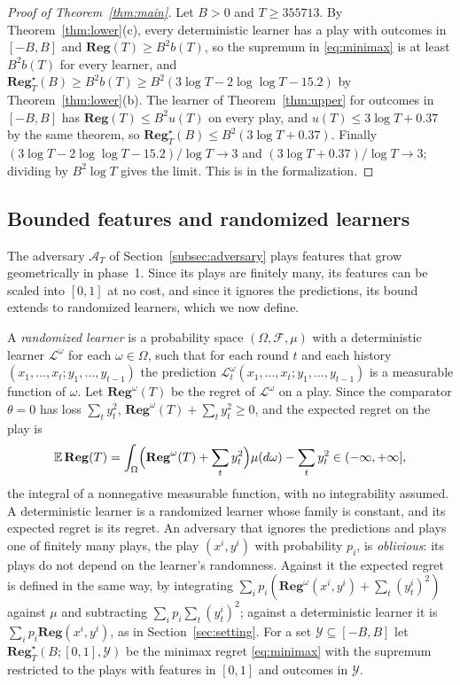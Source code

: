 \documentclass[12pt]{amsart}
\theoremstyle{definition}
\numberwithin{equation}{section}
\newcommand{\E}{\mathbb{E}}
\newcommand{\Reg}{\mathbf{Reg}}
\newcommand{\Regs}{\mathbf{Reg}^{\star}}
\begin{document}
\begin{proof}[Proof of Theorem~\ref{thm:main}]
Let $B>0$ and $T\ge355713$. By Theorem~\ref{thm:lower}(c), every deterministic learner has a play with outcomes in $[-B,B]$ and $\Reg(T)\ge B^2b(T)$, so the supremum in \eqref{eq:minimax} is at least $B^2b(T)$ for every learner, and $\Regs_T(B)\ge B^2b(T)\ge B^2(3\log T-2\log\log T-15.2)$ by Theorem~\ref{thm:lower}(b). The learner of Theorem~\ref{thm:upper} for outcomes in $[-B,B]$ has $\Reg(T)\le B^2u(T)$ on every play, and $u(T)\le3\log T+0.37$ by the same theorem, so $\Regs_T(B)\le B^2(3\log T+0.37)$. Finally $(3\log T-2\log\log T-15.2)/\log T\to3$ and $(3\log T+0.37)/\log T\to3$; dividing by $B^2\log T$ gives the limit. This is  in the formalization.
\end{proof}

\subsection{Bounded features and randomized learners}
The adversary $\mathcal A_T$ of Section~\ref{subsec:adversary} plays features that grow geometrically in phase~1. Since its plays are finitely many, its features can be scaled into $[0,1]$ at no cost, and since it ignores the predictions, its bound extends to randomized learners, which we now define.

A \emph{randomized learner} is a probability space $(\Omega,\mathcal F,\mu)$ with a deterministic learner $\mathcal L^\omega$ for each $\omega\in\Omega$, such that for each round $t$ and each history $(x_1,\dots,x_t;y_1,\dots,y_{t-1})$ the prediction $\mathcal L^\omega_t(x_1,\dots,x_t;y_1,\dots,y_{t-1})$ is a measurable function of $\omega$. Let $\Reg^\omega(T)$ be the regret of $\mathcal L^\omega$ on a play. Since the comparator $\theta=0$ has loss $\sum_ty_t^2$, $\Reg^\omega(T)+\sum_ty_t^2\ge0$, and the expected regret on the play is
\[
\E\,\Reg(T)=\int_\Omega\Bigl(\Reg^\omega(T)+\sum_ty_t^2\Bigr)\mu(d\omega)-\sum_ty_t^2\in(-\infty,+\infty],
\]
the integral of a nonnegative measurable function, with no integrability assumed. A deterministic learner is a randomized learner whose family is constant, and its expected regret is its regret. An adversary that ignores the predictions and plays one of finitely many plays, the play $(x^i,y^i)$ with probability $p_i$, is \emph{oblivious}: its plays do not depend on the learner's randomness. Against it the expected regret is defined in the same way, by integrating $\sum_ip_i(\Reg^\omega(x^i,y^i)+\sum_t(y^i_t)^2)$ against $\mu$ and subtracting $\sum_ip_i\sum_t(y^i_t)^2$; against a deterministic learner it is $\sum_ip_i\Reg(x^i,y^i)$, as in Section~\ref{sec:setting}. For a set $\mathcal Y\subseteq[-B,B]$ let $\Regs_T(B;[0,1],\mathcal Y)$ be the minimax regret \eqref{eq:minimax} with the supremum restricted to the plays with features in $[0,1]$ and outcomes in $\mathcal Y$.
\end{document}

